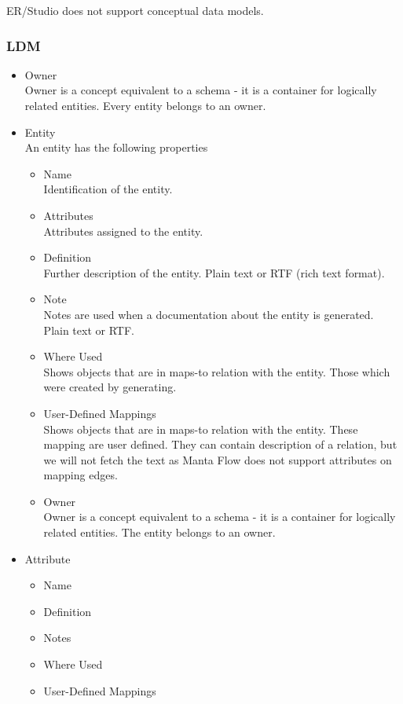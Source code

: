 ER/Studio does not support conceptual data models.

\subsubsection{LDM}


\begin{itemize}
	\item Owner \\ 
	Owner is a concept equivalent to a schema - it is a container for logically related entities. Every entity belongs to an owner.
	\item Entity \\
	An entity has the following properties
	\begin{itemize}
		\item Name \\ 
		Identification of the entity.
		\item Attributes \\ 
		Attributes assigned to the entity.
		\item Definition \\
		Further description of the entity. Plain text or RTF (rich text format).
		\item Note \\
		Notes are used when a documentation about the entity is generated. Plain text or RTF.
		\item Where Used \\
		Shows objects that are in maps-to relation with the entity. Those which were created by generating.
		\item User-Defined Mappings \\
		Shows objects that are in maps-to relation with the entity. These mapping are user defined. They can contain description of a relation, but we will not fetch the text as Manta Flow does not support attributes on mapping edges.
		\item Owner \\
		Owner is a concept equivalent to a schema - it is a container for logically related entities. The entity belongs to an owner.
	\end{itemize}
	\item Attribute
	\begin{itemize}
		\item Name
		\item Definition
		\item Notes
		\item Where Used
		\item User-Defined Mappings
	\end{itemize}
\end{itemize}


